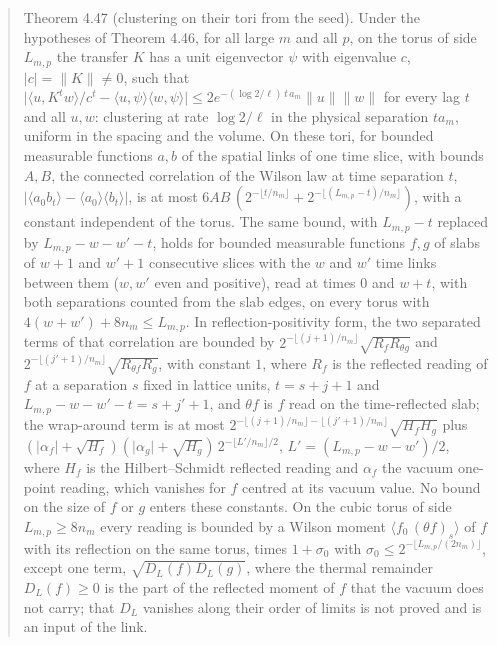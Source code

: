 \documentclass[10pt,letterpaper,twocolumn]{article}
\begin{document}
\begin{quote}
Theorem 4.47 (clustering on their tori from the seed). Under the hypotheses of Theorem 4.46, for all large \(m\) and all \(p\), on the torus of side \(L_{m,p}\) the transfer \(K\) has a unit eigenvector \(\psi\) with eigenvalue \(c\), \(\lvert c\rvert=\lVert K\rVert\ne0\), such that \(\lvert\langle u,K^tw\rangle/c^t-\langle u,\psi\rangle\langle w,\psi\rangle\rvert\le2e^{-(\log2/\ell)\,t\,a_m}\lVert u\rVert\lVert w\rVert\) for every lag \(t\) and all \(u,w\): clustering at rate \(\log2/\ell\) in the physical separation \(ta_m\), uniform in the spacing and the volume. On these tori, for bounded measurable functions \(a,b\) of the spatial links of one time slice, with bounds \(A,B\), the connected correlation of the Wilson law at time separation \(t\), \(\lvert\langle a_0b_t\rangle-\langle a_0\rangle\langle b_t\rangle\rvert\), is at most \(6AB\,(2^{-\lfloor t/n_m\rfloor}+2^{-\lfloor(L_{m,p}-t)/n_m\rfloor})\), with a constant independent of the torus. The same bound, with \(L_{m,p}-t\) replaced by \(L_{m,p}-w-w'-t\), holds for bounded measurable functions \(f,g\) of slabs of \(w+1\) and \(w'+1\) consecutive slices with the \(w\) and \(w'\) time links between them (\(w,w'\) even and positive), read at times \(0\) and \(w+t\), with both separations counted from the slab edges, on every torus with \(4(w+w')+8n_m\le L_{m,p}\). In reflection-positivity form, the two separated terms of that correlation are bounded by \(2^{-\lfloor (j+1)/n_m\rfloor}\sqrt{R_f R_{\theta g}}\) and \(2^{-\lfloor (j'+1)/n_m\rfloor}\sqrt{R_{\theta f}R_g}\), with constant \(1\), where \(R_f\) is the reflected reading of \(f\) at a separation \(s\) fixed in lattice units, \(t=s+j+1\) and \(L_{m,p}-w-w'-t=s+j'+1\), and \(\theta f\) is \(f\) read on the time-reflected slab; the wrap-around term is at most \(2^{-\lfloor (j+1)/n_m\rfloor-\lfloor (j'+1)/n_m\rfloor}\sqrt{H_fH_g}\) plus \((\lvert\alpha_f\rvert+\sqrt{H_f})(\lvert\alpha_g\rvert+\sqrt{H_g})\,2^{-\lfloor L'/n_m\rfloor/2}\), \(L'=(L_{m,p}-w-w')/2\), where \(H_f\) is the Hilbert--Schmidt reflected reading and \(\alpha_f\) the vacuum one-point reading, which vanishes for \(f\) centred at its vacuum value. No bound on the size of \(f\) or \(g\) enters these constants. On the cubic torus of side \(L_{m,p}\ge8n_m\) every reading is bounded by a Wilson moment \(\langle f_0\,(\theta f)_s\rangle\) of \(f\) with its reflection on the same torus, times \(1+\sigma_0\) with \(\sigma_0\le2^{-\lfloor L_{m,p}/(2n_m)\rfloor}\), except one term, \(\sqrt{D_L(f)D_L(g)}\), where the thermal remainder \(D_L(f)\ge0\) is the part of the reflected moment of \(f\) that the vacuum does not carry; that \(D_L\) vanishes along their order of limits is not proved and is an input of the link.
\end{quote}
\end{document}
